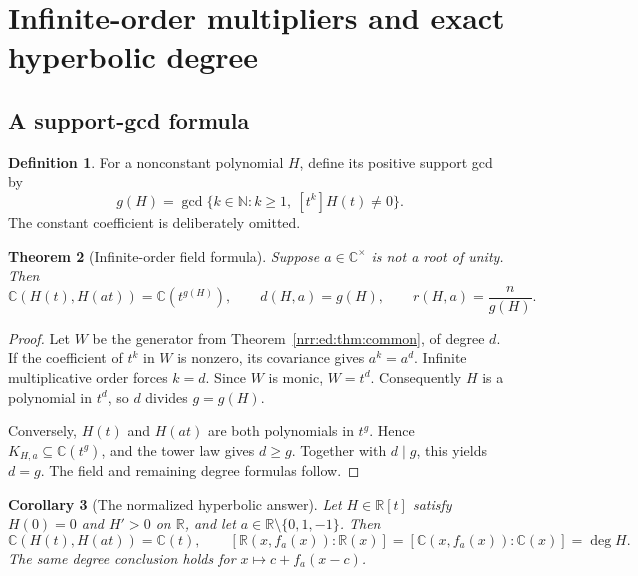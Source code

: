 \documentclass[11pt,letterpaper]{article}
\newtheorem{theorem}{Theorem}[section]
\newtheorem{corollary}[theorem]{Corollary}
\theoremstyle{definition}
\newtheorem{definition}[theorem]{Definition}
\theoremstyle{remark}
\newcommand{\R}{\mathbb R}
\newcommand{\C}{\mathbb C}
\newcommand{\N}{\mathbb N}
\newcommand{\field}{K_{H,a}}
\begin{document}
\section{Infinite-order multipliers and exact hyperbolic degree}
\label{nrr:ed:sec:infinite}

\subsection{A support-gcd formula}

\begin{definition}
For a nonconstant polynomial $H$, define its positive support gcd by
\[
 g(H)=\gcd\{k\in\N:k\ge1,\ [t^k]H(t)\ne0\}.
\]
The constant coefficient is deliberately omitted.
\end{definition}

\begin{theorem}[Infinite-order field formula]
\label{nrr:ed:thm:gcd}
Suppose $a\in\C^\times$ is not a root of unity. Then
\begin{equation}
 \C(H(t),H(at))=\C(t^{g(H)}),\qquad
 d(H,a)=g(H),\qquad r(H,a)=\frac{n}{g(H)}.
 \label{nrr:ed:eq:gcd-formula}
\end{equation}
\end{theorem}

\begin{proof}
Let $W$ be the generator from Theorem~\ref{nrr:ed:thm:common}, of degree $d$.
If the coefficient of $t^k$ in $W$ is nonzero, its covariance gives $a^k=a^d$.
Infinite multiplicative order forces $k=d$. Since $W$ is monic, $W=t^d$.
Consequently $H$ is a polynomial in $t^d$, so $d$ divides $g=g(H)$.

Conversely, $H(t)$ and $H(at)$ are both polynomials in $t^g$. Hence
$\field\subseteq\C(t^g)$, and the tower law gives $d\ge g$. Together with
$d\mid g$, this yields $d=g$. The field and remaining degree formulas follow.
\end{proof}

\begin{corollary}[The normalized hyperbolic answer]
\label{nrr:ed:cor:normalized}
Let $H\in\R[t]$ satisfy $H(0)=0$ and $H'>0$ on $\R$, and let
$a\in\R\setminus\{0,1,-1\}$. Then
\begin{equation}
 \C(H(t),H(at))=\C(t),\qquad
 [\R(x,f_a(x)):\R(x)]=[\C(x,f_a(x)):\C(x)]=\deg H.
 \label{nrr:ed:eq:normalized-answer}
\end{equation}
The same degree conclusion holds for $x\mapsto c+f_a(x-c)$.
\end{corollary}
\end{document}

